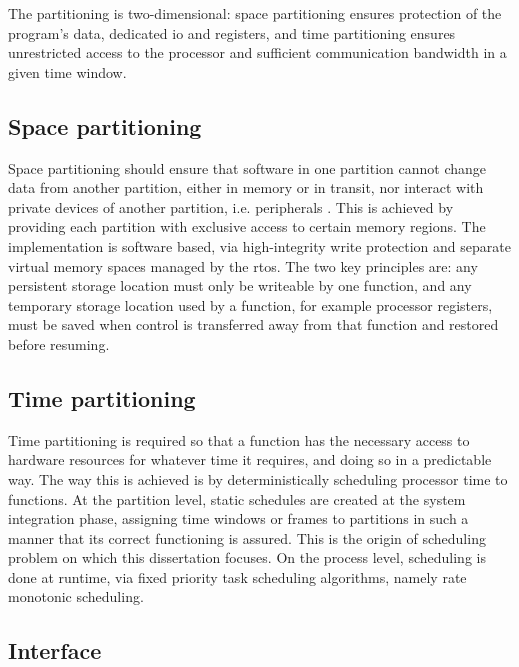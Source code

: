 \documentclass[main.tex]{subfiles}
\begin{document}
The partitioning is two-dimensional: space partitioning ensures protection of the program's data, dedicated \gls{io} and registers, and time partitioning ensures unrestricted access to the processor and sufficient communication bandwidth in a given time window.

\subsection{Space partitioning}

Space partitioning should ensure that software in one partition cannot change data from another partition, either in memory or in transit, nor interact with private devices of another partition, i.e. peripherals \cite{ananda2013arinc}.
This is achieved by providing each partition with exclusive access to certain memory regions.
The implementation is software based, via high-integrity write protection and separate virtual memory spaces managed by the \gls{rtos}. 
The two key principles are: any persistent storage location must only be writeable by one function, and any temporary storage location used by a function, for example processor registers, must be saved when control is transferred away from that function and restored before resuming.

\subsection{Time partitioning}

Time partitioning is required so that a function has the necessary access to hardware resources for whatever time it requires, and doing so in a predictable way.
The way this is achieved is by deterministically scheduling processor time to functions.
At the partition level, static schedules are created at the system integration phase, assigning time windows or frames to partitions in such a manner that its correct functioning is assured.
This is the origin of scheduling problem on which this dissertation focuses.
On the process level, scheduling is done at runtime, via fixed priority task scheduling algorithms, namely rate monotonic scheduling.

\subsection{Interface}
\label{sec:interface}
\end{document}
